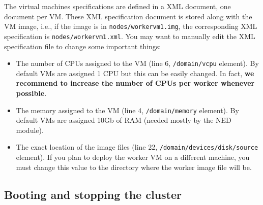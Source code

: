 \documentclass[a4]{article}
\begin{document}
The virtual machines specifications are defined in a XML document, one
document per VM. These XML specification document is stored along with the
VM image, i.e., if the image is in \texttt{nodes/workervm1.img}, the
corresponding XML specification is \texttt{nodes/workervm1.xml}. You may
want to manually edit the XML specification file to change some important
things:
\begin{itemize}
\item The number of CPUs assigned to the VM (line 6, \texttt{/domain/vcpu}
  element). By default VMs are assigned 1 CPU but this can be easily
  changed. In fact, \textbf{we recommend to increase the number of CPUs per
    worker whenever possible}.
\item The memory assigned to the VM (line 4, \texttt{/domain/memory}
  element). By default VMs are assigned 10Gb of RAM (needed mostly by the
  NED module).
\item The exact location of the image files (line 22,
  \texttt{/domain/devices/disk/source} element). If you plan to deploy the
  worker VM on a different machine, you must change this value to
  the directory where the worker image file will be.
\end{itemize}





\subsection{Booting and stopping the cluster}
\label{sec:boot-stopp-clust}
\end{document}
